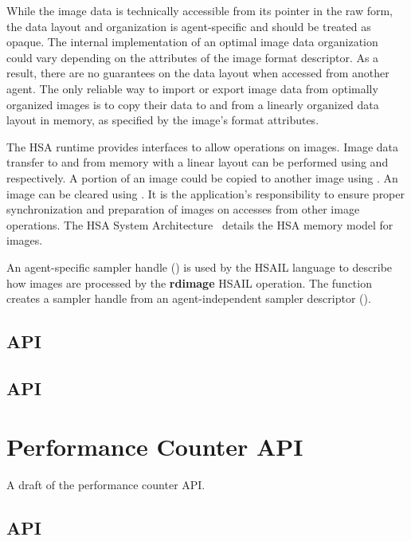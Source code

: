 \documentclass[oneside]{book}
\newcommand{\reffun}[1]{\textbf{#1}}
\newcommand{\refhsl}[1]{\reffun{#1}}
\begin{document}
While the image data is technically accessible from its pointer in the raw form,
the data layout and organization is agent-specific and should be treated as
opaque. The internal implementation of an optimal image data organization could
vary depending on the attributes of the image format descriptor. As a result,
there are no guarantees on the data layout when accessed from another agent. The
only reliable way to import or export image data from optimally organized images
is to copy their data to and from a linearly organized data layout in memory, as
specified by the image's format attributes.

The HSA runtime provides interfaces to allow operations on images. Image data
transfer to and from memory with a linear layout can be performed using
 and  respectively. A
portion of an image could be copied to another image using
. An image can be cleared using
. It is the application's responsibility to ensure
proper synchronization and preparation of images on accesses from other image
operations. The HSA System Architecture~\cite{sar} details the HSA memory
model for images.

An agent-specific sampler handle () is used by the
HSAIL language to describe how images are processed by the \refhsl{rdimage}
HSAIL operation. The function  creates a sampler
handle from an agent-independent sampler descriptor
().

\subsection{API}


\subsection{API}


\section{Performance Counter API}\label{sec:perfcount}
A draft of the performance counter API.

\subsection{API}

\end{document}
